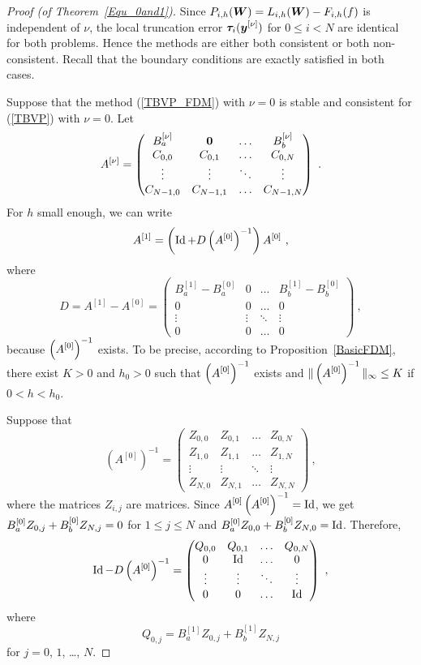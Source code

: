 \begin{proof}[Proof (of Theorem~\ref{Equ_0and1})]
Since $P_{i,h}(\bm{W}) = L_{i,h}(\bm{W}) - F_{i,h}(f)$ is
independent of $\nu$, the local truncation error
$\displaystyle \bm{\tau}_i(\bm{y}^{[\nu]})$ for $0\leq i < N$ are
identical for both problems.  Hence the methods are either both
consistent or both non-consistent.  Recall that the boundary
conditions are exactly satisfied in both cases.

Suppose that the method (\ref{TBVP_FDM}) with $\nu=0$ is stable
and consistent for (\ref{TBVP}) with $\nu=0$.  Let
\[
A^{[\nu]} = \begin{pmatrix}
B_a^{[\nu]} & \bm{0} & \ldots & B_b^{[\nu]} \\
C_{0,0} & C_{0,1} & \ldots & C_{0,N} \\
\vdots & \vdots & \ddots & \vdots \\
C_{N-1,0} & C_{N-1,1} & \ldots & C_{N-1,N}
\end{pmatrix} \ .
\]
For $h$ small enough, we can write
\begin{equation}\label{TBVP_FDMp1}
A^{[1]} = \left( \operatorname{Id} + D
 \left(A^{[0]}\right)^{-1}\right)A^{[0]} \ ,
\end{equation}
where
\[
  D = A^{[1]} - A^{[0]}
= \begin{pmatrix}
B_a^{[1]} - B_a^{[0]} & 0 & \ldots & B_b^{[1]} - B_b^{[0]} \\
0 & 0 & \ldots & 0 \\
\vdots & \vdots & \ddots & \vdots \\
0 & 0 & \ldots &0
\end{pmatrix} \ ,
\]
because $\displaystyle \left(A^{[0]}\right)^{-1}$ exists.  To be
precise, according to Proposition~\ref{BasicFDM}, there exist $K>0$
and $h_0>0$ such that $\displaystyle \left(A^{[0]}\right)^{-1}$ exists and
$\displaystyle \| \left(A^{[0]}\right)^{-1} \|_\infty \leq K$ if $0<h < h_0$.

Suppose that
\[
\left(A^{[0]}\right)^{-1}= \begin{pmatrix}
Z_{0,0} & Z_{0,1} & \ldots & Z_{0,N} \\
Z_{1,0} & Z_{1,1} & \ldots & Z_{1,N} \\
\vdots & \vdots & \ddots & \vdots \\
Z_{N,0} & Z_{N,1} & \ldots & Z_{N,N}
\end{pmatrix} \ ,
\]
where the matrices $Z_{i,j}$ are \nn matrices.
Since $\displaystyle A^{[0]} \left(A^{[0]}\right)^{-1}= \operatorname{Id}$, we get
$\displaystyle B_a^{[0]}Z_{0,j} + B_b^{[0]} Z_{N,j} = 0$ for $1\leq j \leq N$
and $\displaystyle B_a^{[0]}Z_{0,0} + B_b^{[0]} Z_{N,0} = \operatorname{Id}$.  Therefore,
\[
\operatorname{Id} - D \left(A^{[0]}\right)^{-1} = \begin{pmatrix}
Q_{0,0} & Q_{0,1} & \ldots & Q_{0,N} \\
0 & \operatorname{Id} &  \ldots & 0 \\
\vdots  & \vdots & \ddots & \vdots \\
0 & 0 & \ldots & \operatorname{Id}
\end{pmatrix} \ ,
\]
where
\[
Q_{0,j} = B_a^{[1]} Z_{0,j} + B_b^{[1]}Z_{N,j}
\]
for $j=0$, $1$, \ldots, $N$.


\end{proof}
